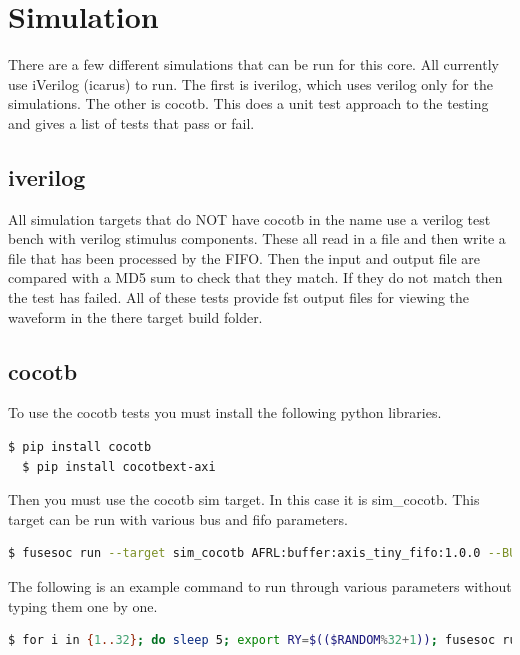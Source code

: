 \newpage

\section{Simulation}
\par
There are a few different simulations that can be run for this core. All currently use iVerilog (icarus) to run. The first is iverilog, which
uses verilog only for the simulations. The other is cocotb. This does a unit test approach to the testing and gives a list of tests that pass
or fail.

\subsection{iverilog}
\par
All simulation targets that do NOT have cocotb in the name use a verilog test bench with verilog stimulus components. These all read in a file
and then write a file that has been processed by the FIFO. Then the input and output file are compared with a MD5 sum to check that they
match. If they do not match then the test has failed. All of these tests provide fst output files for viewing the waveform in the there
target build folder.

\subsection{cocotb}
\par
To use the cocotb tests you must install the following python libraries.
\begin{lstlisting}[language=bash]
  $ pip install cocotb
  $ pip install cocotbext-axi
\end{lstlisting}

Then you must use the cocotb sim target. In this case it is sim\_cocotb. This target can be run with various bus and fifo parameters.
\begin{lstlisting}[language=bash]
  $ fusesoc run --target sim_cocotb AFRL:buffer:axis_tiny_fifo:1.0.0 --BUS_WIDTH=8 --FIFO_DEPTH=32
\end{lstlisting}

The following is an example command to run through various parameters without typing them one by one.
\begin{lstlisting}[language=bash]
  $ for i in {1..32}; do sleep 5; export RY=$(($RANDOM%32+1)); fusesoc run --target sim_cocotb AFRL:buffer:axis_tiny_fifo:1.0.0 --BUS_WIDTH=$i --FIFO_DEPTH=$RY; echo "BUS WIDTH:" $i "FIFO DEPTH:" $RY; done
\end{lstlisting}

